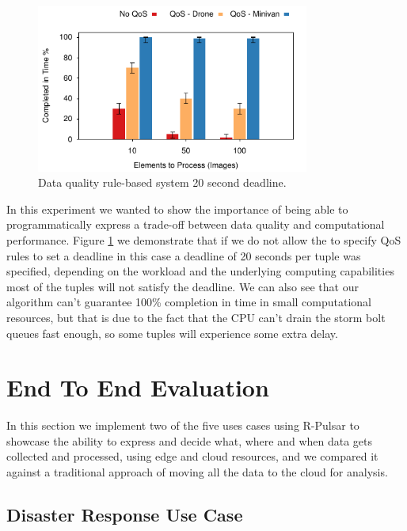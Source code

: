 \begin{figure}[h!]
  \centering
  \includegraphics[width=0.8\textwidth]{Results/QoS}
  \caption{Data quality rule-based system 20 second deadline.}
  \label{fig:QoS}
\end{figure}

In this experiment we wanted to show the importance of being able to programmatically express a trade-off between data quality and computational performance. Figure \ref{fig:QoS} we demonstrate that if we do not allow the to specify QoS rules to set a deadline in this case a deadline of 20 seconds per tuple was specified, depending on the workload and the underlying computing capabilities most of the tuples will not satisfy the deadline. We can also see that our algorithm can't guarantee 100\% completion in time in small computational resources, but that is due to the fact that the CPU can't drain the storm bolt queues fast enough, so some tuples will experience some extra delay.

\section{End To End Evaluation}
In this section we implement two of the five uses cases using R-Pulsar to showcase the ability to express and decide what, where and when data gets collected and processed, using edge and cloud resources, and we compared it against a traditional approach of moving all the data to the cloud for analysis.

\subsection{Disaster Response Use Case}

